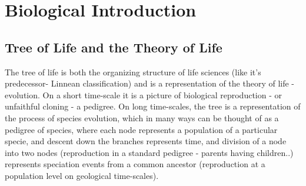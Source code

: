 \section{Biological Introduction}

\subsection{Tree of Life and the Theory of Life}
The tree of life is both the organizing structure of life sciences (like it's predecessor- Linnean classification) and is a representation of the theory of life - evolution.  On a short time-scale it is a picture of biological reproduction - or unfaithful cloning - a pedigree.  On long time-scales, the tree is a representation of the process of species evolution, which in many ways can be thought of as a pedigree of species, where each node represents a population of a particular specie, and descent down the branches represents time, and division of a node into two nodes (reproduction in a standard pedigree - parents having children..) represents speciation events from a common ancestor (reproduction at a population level on geological time-scales).
